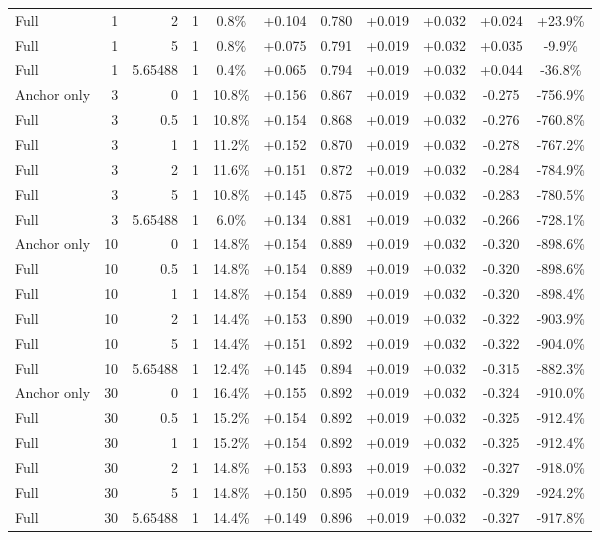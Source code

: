 \begin{table}[htbp]
\begin{tabular}{lrrrccccccc}
Full & 1 & 2 & 1 & 0.8\% & +0.104 & 0.780 & +0.019 & +0.032 & +0.024 & +23.9\% \\
Full & 1 & 5 & 1 & 0.8\% & +0.075 & 0.791 & +0.019 & +0.032 & +0.035 & -9.9\% \\
Full & 1 & 5.65488 & 1 & 0.4\% & +0.065 & 0.794 & +0.019 & +0.032 & +0.044 & -36.8\% \\
Anchor only & 3 & 0 & 1 & 10.8\% & +0.156 & 0.867 & +0.019 & +0.032 & -0.275 & -756.9\% \\
Full & 3 & 0.5 & 1 & 10.8\% & +0.154 & 0.868 & +0.019 & +0.032 & -0.276 & -760.8\% \\
Full & 3 & 1 & 1 & 11.2\% & +0.152 & 0.870 & +0.019 & +0.032 & -0.278 & -767.2\% \\
Full & 3 & 2 & 1 & 11.6\% & +0.151 & 0.872 & +0.019 & +0.032 & -0.284 & -784.9\% \\
Full & 3 & 5 & 1 & 10.8\% & +0.145 & 0.875 & +0.019 & +0.032 & -0.283 & -780.5\% \\
Full & 3 & 5.65488 & 1 & 6.0\% & +0.134 & 0.881 & +0.019 & +0.032 & -0.266 & -728.1\% \\
Anchor only & 10 & 0 & 1 & 14.8\% & +0.154 & 0.889 & +0.019 & +0.032 & -0.320 & -898.6\% \\
Full & 10 & 0.5 & 1 & 14.8\% & +0.154 & 0.889 & +0.019 & +0.032 & -0.320 & -898.6\% \\
Full & 10 & 1 & 1 & 14.8\% & +0.154 & 0.889 & +0.019 & +0.032 & -0.320 & -898.4\% \\
Full & 10 & 2 & 1 & 14.4\% & +0.153 & 0.890 & +0.019 & +0.032 & -0.322 & -903.9\% \\
Full & 10 & 5 & 1 & 14.4\% & +0.151 & 0.892 & +0.019 & +0.032 & -0.322 & -904.0\% \\
Full & 10 & 5.65488 & 1 & 12.4\% & +0.145 & 0.894 & +0.019 & +0.032 & -0.315 & -882.3\% \\
Anchor only & 30 & 0 & 1 & 16.4\% & +0.155 & 0.892 & +0.019 & +0.032 & -0.324 & -910.0\% \\
Full & 30 & 0.5 & 1 & 15.2\% & +0.154 & 0.892 & +0.019 & +0.032 & -0.325 & -912.4\% \\
Full & 30 & 1 & 1 & 15.2\% & +0.154 & 0.892 & +0.019 & +0.032 & -0.325 & -912.4\% \\
Full & 30 & 2 & 1 & 14.8\% & +0.153 & 0.893 & +0.019 & +0.032 & -0.327 & -918.0\% \\
Full & 30 & 5 & 1 & 14.8\% & +0.150 & 0.895 & +0.019 & +0.032 & -0.329 & -924.2\% \\
Full & 30 & 5.65488 & 1 & 14.4\% & +0.149 & 0.896 & +0.019 & +0.032 & -0.327 & -917.8\% \\

\end{tabular}
\end{table}
